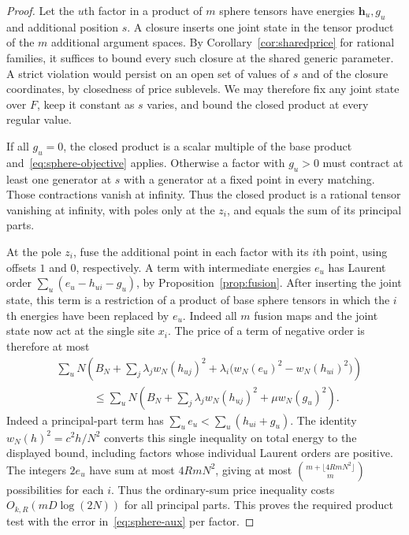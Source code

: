 \begin{proof}
Let the \(u\)th factor in a product of \(m\) sphere tensors have energies
\(\mathbf h_u,g_u\) and additional position \(s\). A closure inserts
one joint state in the tensor product of the \(m\) additional argument
spaces. By Corollary~\ref{cor:sharedprice} for rational families, it
suffices to bound every such closure at the shared generic parameter.
A strict violation would persist on an open set of values of \(s\)
and of the closure coordinates, by closedness of price sublevels.
We may therefore fix any joint state over \(F\), keep it constant
as \(s\) varies, and bound the closed product at every regular value.

If all \(g_u=0\), the closed product is a scalar multiple of the base
product and~\eqref{eq:sphere-objective} applies.
Otherwise a factor with \(g_u>0\) must contract at least one generator
at \(s\) with a generator at a fixed point in every matching. Those
contractions vanish at infinity. Thus the closed product is a rational
tensor vanishing at infinity, with poles only at the \(z_i\), and equals
the sum of its principal parts.

At the pole \(z_i\), fuse the additional point in each factor with its
\(i\)th point, using offsets \(1\) and \(0\), respectively. A term with
intermediate energies \(e_u\) has Laurent order \(\sum_u(e_u-h_{ui}-g_u)\), by
Proposition~\ref{prop:fusion}. After inserting the joint state, this term
is a restriction of a product of base sphere tensors in which the
\(i\)th energies have been replaced by \(e_u\). Indeed all \(m\) fusion
maps and the joint state now act at the single site \(x_i\). The price
of a term of negative order is therefore at most
\begin{align*}
 &\sum_u N\left(B_N+\sum_j\lambda_j w_N(h_{uj})^2
             +\lambda_i\bigl(w_N(e_u)^2-w_N(h_{ui})^2\bigr)\right)
 \\
 &\hspace{40pt}\le \sum_u N\left(B_N+\sum_j\lambda_j w_N(h_{uj})^2
                      +\mu w_N(g_u)^2\right).
\end{align*}
Indeed a principal-part term has \(\sum_u e_u<\sum_u(h_{ui}+g_u)\).
The identity \(w_N(h)^2=c^2h/N^2\) converts this single inequality
on total energy to the displayed bound, including factors whose
individual Laurent orders are positive. The integers \(2e_u\) have sum at most
\(4RmN^2\), giving at most
\(\binom{m+\lfloor4RmN^2\rfloor}{m}\) possibilities for each \(i\).
Thus the ordinary-sum price inequality costs \(O_{k,R}(mD\log(2N))\)
for all principal parts. This proves the required product test with
the error in~\eqref{eq:sphere-aux} per factor.
\end{proof}

